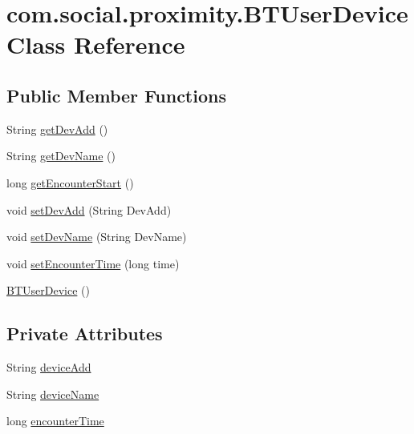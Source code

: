 \hypertarget{classcom_1_1social_1_1proximity_1_1_b_t_user_device}{}\section{com.\+social.\+proximity.\+B\+T\+User\+Device Class Reference}
\label{classcom_1_1social_1_1proximity_1_1_b_t_user_device}
\subsection*{Public Member Functions}
\begin{DoxyCompactItemize}
\item 
String \hyperlink{classcom_1_1social_1_1proximity_1_1_b_t_user_device_a111491f388c7a0278ad8735f0f60a7c0}{get\+Dev\+Add} ()
\item 
String \hyperlink{classcom_1_1social_1_1proximity_1_1_b_t_user_device_ae4219c81d1ad630846eb411daa2281a7}{get\+Dev\+Name} ()
\item 
long \hyperlink{classcom_1_1social_1_1proximity_1_1_b_t_user_device_a3e0316e324e595f23c1159f0c64c0e0e}{get\+Encounter\+Start} ()
\item 
void \hyperlink{classcom_1_1social_1_1proximity_1_1_b_t_user_device_ac59759bb162e2f9de0ddf5e69489961c}{set\+Dev\+Add} (String Dev\+Add)
\item 
void \hyperlink{classcom_1_1social_1_1proximity_1_1_b_t_user_device_a9fce5109dbf9d6ded5b68d3bb399ff82}{set\+Dev\+Name} (String Dev\+Name)
\item 
void \hyperlink{classcom_1_1social_1_1proximity_1_1_b_t_user_device_aeaf66429d6daa5c7bea88093e9fa5ce2}{set\+Encounter\+Time} (long time)
\item 
\hyperlink{classcom_1_1social_1_1proximity_1_1_b_t_user_device_a54deca8ac2939906d4073c69c6db81b6}{B\+T\+User\+Device} ()
\end{DoxyCompactItemize}
\subsection*{Private Attributes}
\begin{DoxyCompactItemize}
\item 
String \hyperlink{classcom_1_1social_1_1proximity_1_1_b_t_user_device_ab65baab0d331ac27cc29a0ed37ddfb1d}{device\+Add}
\item 
String \hyperlink{classcom_1_1social_1_1proximity_1_1_b_t_user_device_aa1229c4d721506b60cd391787e4976c3}{device\+Name}
\item 
long \hyperlink{classcom_1_1social_1_1proximity_1_1_b_t_user_device_a59404150e780de3e55d6174cbfa850f3}{encounter\+Time}
\end{DoxyCompactItemize}


